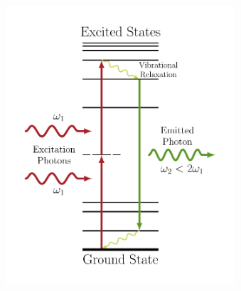 \documentclass{beamer}
\begin{document}
\begin{frame}
\begin{columns}
\begin{figure}
\centering
\includegraphics[width=\textwidth]{diag-levelsflourescence}
\end{figure}
\begin{figure}
\centering

\end{figure}
\end{columns}
\end{frame}
\end{document}

